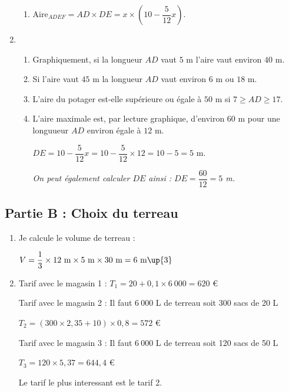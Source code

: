 \begin{enumerate}
\begin{enumerate}
        \item $\text{Aire}_{ADEF} = AD\times DE = x\times \left(10-\dfrac{5}{12}x\right)$.
    \end{enumerate}
    \item 
    \begin{enumerate}
        \item Graphiquement, si la longueur $AD$ vaut $5$ m l'aire vaut environ $40$ m.
        \item Si l'aire vaut $45$ m la longueur $AD$ vaut environ $6$ m ou $18$ m.
        \item L'aire du potager est-elle supérieure ou égale à $50$ m si $7\geq AD \geq 17$.
        \item L'aire maximale est, par lecture graphique, d'environ $60$ m pour une longuueur $AD$ environ égale à $12$ m.
        
        $DE=10-\dfrac{5}{12}x = 10-\dfrac{5}{12}\times 12 = 10-5 = 5$ m.

        \textit{On peut également calculer $DE$ ainsi : $DE=\dfrac{60}{12}=5$ m.}
    \end{enumerate}
\end{enumerate}

\subsection*{Partie B : Choix du terreau}
\begin{enumerate}
    \item Je calcule le volume de terreau :
    
    $V=\dfrac{1}{3}\times 12~\text{m}\times 5~\text{m}\times 30~\text{m} = 6~\text{m\up{3}}$

    \item Tarif avec le magasin 1 : $T_1 = 20+0,1\times 6~000 = 620$ \euro
    
    Tarif avec le magasin 2 : Il faut $6~000$ L de terreau soit 300 sacs de 20 L    
    
    $T_2 = (300\times 2,35+10)\times 0,8 = 572$ \euro

    Tarif avec le magasin 3 : Il faut $6~000$ L de terreau soit 120 sacs de 50 L
    
    $T_3 = 120\times 5,37 = 644,4$ \euro

    Le tarif le plus interessant est le tarif 2.

\end{enumerate}

